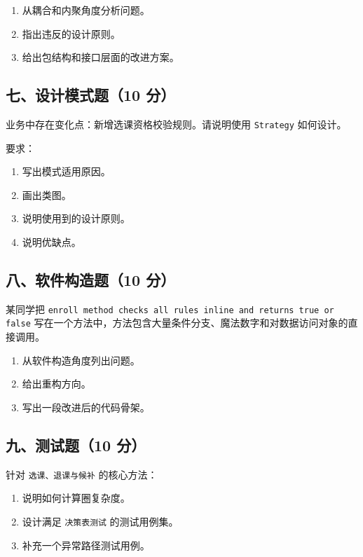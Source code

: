 \documentclass[UTF8,zihao=-4]{ctexart}
\begin{document}
\begin{enumerate}
\item 从耦合和内聚角度分析问题。
\item 指出违反的设计原则。
\item 给出包结构和接口层面的改进方案。
\end{enumerate}


\subsection{七、设计模式题（10 分）}


业务中存在变化点：新增选课资格校验规则。请说明使用 \texttt{Strategy} 如何设计。


要求：


\begin{enumerate}
\item 写出模式适用原因。
\item 画出类图。
\item 说明使用到的设计原则。
\item 说明优缺点。
\end{enumerate}


\subsection{八、软件构造题（10 分）}


某同学把 \texttt{enroll method checks all rules inline and returns true or false} 写在一个方法中，方法包含大量条件分支、魔法数字和对数据访问对象的直接调用。


\begin{enumerate}
\item 从软件构造角度列出问题。
\item 给出重构方向。
\item 写出一段改进后的代码骨架。
\end{enumerate}


\subsection{九、测试题（10 分）}


针对 \texttt{选课、退课与候补} 的核心方法：


\begin{enumerate}
\item 说明如何计算圈复杂度。
\item 设计满足 \texttt{决策表测试} 的测试用例集。
\item 补充一个异常路径测试用例。
\end{enumerate}
\end{document}

